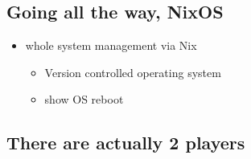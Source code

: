 \documentclass[11pt]{article}
\begin{document}
\subsection{Going all the way, NixOS}
\label{sec:org5474470}
\begin{itemize}
\item whole system management via Nix
\begin{itemize}
\item Version controlled operating system
\item show OS reboot
\end{itemize}
\end{itemize}
\subsection{There are actually 2 players}
\label{sec:org744437c}
\end{document}
